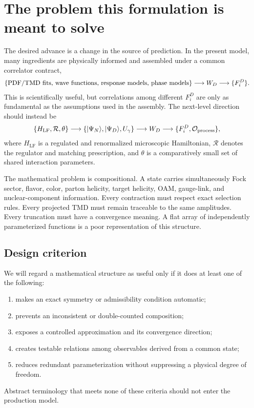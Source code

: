 \documentclass[11pt]{article}
\newcommand{\LF}{\mathrm{LF}}
\begin{document}
\tableofcontents

\section{The problem this formulation is meant to solve}

The desired advance is a change in the source of prediction.  In the present
model, many ingredients are physically informed and assembled under a common
correlator contract,
\begin{equation}
\{\hbox{PDF/TMD fits, wave functions, response models, phase models}\}
\longrightarrow W_D
\longrightarrow \{F_i^D\}.
\label{eq:assembled}
\end{equation}
This is scientifically useful, but correlations among different \(F_i^D\)
are only as fundamental as the assumptions used in the assembly.  The
next-level direction should instead be
\begin{equation}
\{H_{\LF},\mathcal R,\theta\}
\longrightarrow
\{|\Psi_N\rangle,|\Psi_D\rangle,U_\gamma\}
\longrightarrow W_D
\longrightarrow \{F_i^D,\mathcal O_{\rm process}\},
\label{eq:generative}
\end{equation}
where \(H_{\LF}\) is a regulated and renormalized microscopic Hamiltonian,
\(\mathcal R\) denotes the regulator and matching prescription, and
\(\theta\) is a comparatively small set of shared interaction parameters.

The mathematical problem is compositional.  A state carries simultaneously
Fock sector, flavor, color, parton helicity, target helicity, OAM, gauge-link,
and nuclear-component information.  Every contraction must respect exact
selection rules.  Every projected TMD must remain traceable to the same
amplitudes.  Every truncation must have a convergence meaning.  A flat array
of independently parameterized functions is a poor representation of this
structure.

\subsection{Design criterion}

We will regard a mathematical structure as useful only if it does at least
one of the following:
\begin{enumerate}
\item makes an exact symmetry or admissibility condition automatic;
\item prevents an inconsistent or double-counted composition;
\item exposes a controlled approximation and its convergence direction;
\item creates testable relations among observables derived from a common
state;
\item reduces redundant parameterization without suppressing a physical
degree of freedom.
\end{enumerate}
Abstract terminology that meets none of these criteria should not enter the
production model.
\end{document}
